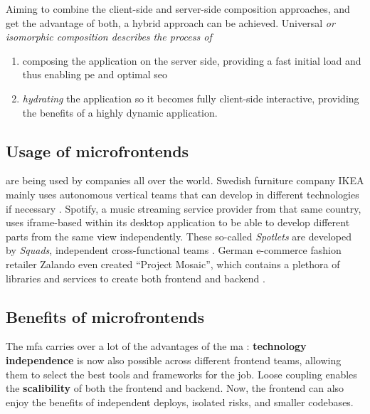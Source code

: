 Aiming to combine the client-side and server-side composition approaches, and
get the advantage of both, a hybrid approach can be achieved. Universal \em or
\textit{isomorphic} \em composition describes the process of 
\begin{enumerate}
  \item composing the application on the server side, providing a fast initial
  load and thus enabling \gls{pe} and optimal \gls{seo}
  \item \textit{hydrating} the application so it becomes fully client-side
  interactive, providing the benefits of a highly dynamic application.
\end{enumerate}


\subsection{Usage of microfrontends}

 are being used by companies all over the world.
Swedish furniture company IKEA mainly uses autonomous vertical teams that can
develop in different technologies if necessary \autocite{Stenberg_2018}.
Spotify, a music streaming service provider from that same country, uses
\gls{iframe}-based  within its desktop application to
be able to develop different parts from the same view independently. These
so-called \textit{Spotlets} are developed by \textit{Squads}, independent
cross-functional teams \autocite{Gall_2018}. German e-commerce fashion retailer
Zalando even created ``Project Mosaic'',
which contains a plethora of libraries and services to create both
\gls{frontend} and \gls{backend} .



\subsection{Benefits of microfrontends}

The \gls{mfa} carries over a lot of the advantages of the \gls{ma}
\autocite{Jackson_2019}: \textbf{technology independence} is now also possible
across different \gls{frontend} teams, allowing them to select the best tools
and frameworks for the job. Loose coupling enables the \textbf{scalibility} of
both the \gls{frontend} and \gls{backend}. Now, the \gls{frontend} can also
enjoy the benefits of independent deploys, isolated risks, and smaller
codebases.

